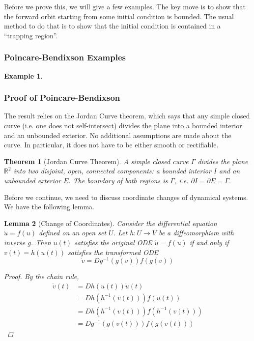 \documentclass{article}
\newtheorem{theorem}{Theorem}[section]
\newtheorem{lemma}[theorem]{Lemma}
\newtheorem{example}{Example}[section]
\def\R{{\mathbb R}}
\begin{document}
Before we prove this, we will give a few examples. The key move is to show that the forward orbit starting from some initial condition is bounded. The usual method to do that is to show that the initial condition is contained in a ``trapping region''.

\subsubsection{Poincare-Bendixson Examples}
\begin{example}
\end{example}

\subsubsection{Proof of Poincare-Bendixson}

The result relies on the Jordan Curve theorem, which says that any simple closed curve (i.e. one does not self-intersect) divides the plane into a bounded interior and an unbounded exterior. No additional assumptions are made about the curve. In particular, it does not have to be either smooth or rectifiable. 

\begin{theorem}[Jordan Curve Theorem]A simple closed curve $\Gamma$ divides the plane $\R^2$ into two disjoint, open, connected components: a bounded interior $I$ and an unbounded exterior $E$. The boundary of both regions is $\Gamma$, i.e. $\partial I = \partial E = \Gamma$.
\end{theorem}

Before we continue, we need to discuss coordinate changes of dynamical systems. We have the following lemma.

\begin{lemma}[Change of Coordinates]
Consider the differential equation $\dot{u} = f(u)$ defined on an open set $U$. Let $h: U \rightarrow V$ be a diffeomorphism with inverse $g$. Then $u(t)$ satisfies the original ODE $\dot{u} = f(u)$ if and only if $v(t) = h(u(t))$ satisfies the transformed ODE
\[
\dot{v} = Dg^{-1}(g(v))f(g(v))
\]
\begin{proof}
By the chain rule,
\begin{align*}
\dot{v}(t) &= Dh(u(t))\dot{u}(t) \\
&= Dh(h^{-1}(v(t))) f(u(t)) \\
&= Dh(h^{-1}(v(t))) f(h^{-1}(v(t))) \\
&= Dg^{-1}(g(v(t))) f(g(v(t))) 
\end{align*}
\end{proof}
\end{lemma}
\end{document}
